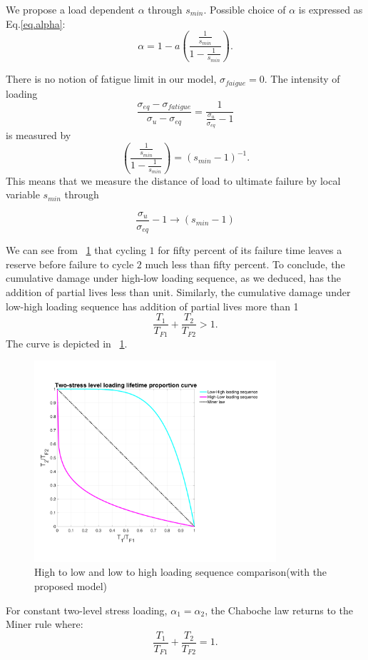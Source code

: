 \documentclass[3p,times,number,review]{elsarticle}
\newcommand{\figref}[1]{\figurename~\ref{#1}}
\begin{document}
We propose a load dependent $\alpha$ through $s_{min}$. Possible choice
of $\alpha$ is expressed as Eq.\eqref{eq.alpha}:
\begin{equation}
\alpha=1-a\left( \dfrac{\frac{1}{s_{min}}}{1-\frac{1}{s_{min}}} \right) .
\label{eq.alpha}
\end{equation}

There is no notion of fatigue limit in our model, $\sigma_{faigue}=0$. The intensity of loading
$$\frac{ \sigma_{eq}-\sigma_{fatigue}}{ \sigma_{u} - \sigma_{eq}}= \frac{ 1}{\frac{\sigma_{u}}{\sigma_{eq}} -1}$$
is measured by 
$$\left( \dfrac{\frac{1}{s_{min}}}{1-\frac{1}{s_{min}}}\right) =\left(s_{min}-1 \right) ^{-1}.$$
This means that we measure the distance of load to ultimate failure by local variable $s_{min}$ through 

$$\frac{\sigma_{u}}{\sigma_{eq}} -1 \longrightarrow \left( s_{min}-1\right)  $$


We can see from \figref{fig.sequence} that cycling $1$ for fifty percent of its failure time leaves a reserve before failure to cycle $2$ much less than fifty percent. To conclude, the cumulative damage under high-low loading sequence, as we deduced, has the addition of partial lives less than unit. Similarly, the cumulative damage under low-high loading sequence has addition of partial lives more than 1
$$\frac{T_1}{T_{F1}}+\frac{T_2}{T_{F2}}>1.$$
The curve is depicted in \figref{fig.sequence}.
\begin{figure}[!h]
\centering
\includegraphics[width=0.8\textwidth]{figures//sequence.png} 
\caption{High to low and low to high loading sequence comparison(with the proposed model)}
\label{fig.sequence}
\end{figure}
For constant two-level stress loading, $\alpha_1=\alpha_2$, the Chaboche law returns to the Miner rule where:
$$\frac{T_1}{T_{F1}}+\frac{T_2}{T_{F2}}=1.$$
\end{document}
